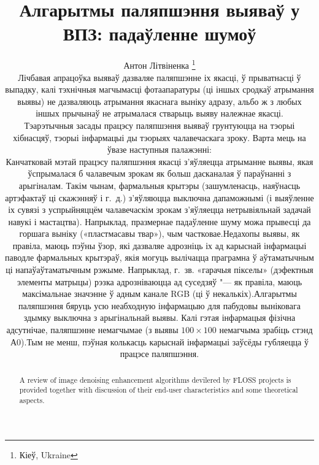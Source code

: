 \documentclass[10pt, a5paper]{article}
\begin{document}
\title{Алгарытмы паляпшэння выяваў у ВПЗ: падаўленне шумоў}
\author{Антон Літвіненка \footnote{Кіеў, Ukraine}
\maketitle
\begin{abstract}
A review of image denoising enhancement algorithms devilered by FLOSS projects is provided together with discussion of their end-user characteristics and some theoretical aspects.
\end{abstract}
Лічбавая апрацоўка выяваў дазваляе паляпшэнне іх якасці, ў прыватнасці ў выпадку, калі тэхнічныя магчымасці фотаапаратуры (ці іншых сродкаў атрымання выявы) не дазваляюць атрымання якаснага выніку адразу, альбо ж з любых іншых прычынаў не атрымалася стварыць выяву належнае якасці.

Тэарэтычныя засады працэсу паляпшэння выяваў грунтуюцца на тэорыі хібнасцяў, тэорыі інфармацыі ды тэорыях чалавечаскага зроку. Варта мець на ўвазе наступныя палажэнні:

\begin{enumerate}
  \item Канчатковай мэтай працэсу паляпшэння якасці з’яўляецца атрыманне выявы, якая ўспрымалася б чалавечым зрокам як больш дасканалая ў параўнанні з арыгіналам. Такім чынам, фармальныя крытэры (зашумленасць, наяўнасць артэфактаў ці скажэнняў і г.~д.) з’яўляюцца выключна дапаможнымі (і выяўленне іх сувязі з успрыйняццём чалавечаскім зрокам з’яўляецца нетрывіяльнай задачай навукі і мастацтва). Напрыклад, празмернае падаўленне шуму можа прывесці да горшага выніку  («пластмасавы твар»), чым частковае.
  \item Недахопы выявы, як правіла, маюць пэўны ўзор, які дазваляе адрозніць іх ад карыснай інфармацыі паводле фармальных крытэраў, якія могуць вылічацца праграмна ў аўтаматычным ці напаўаўтаматычным рэжыме. Напрыклад, г.~зв. «гарачыя пікселы» (дэфектныя элементы матрыцы) рэзка адрозніваюцца ад суседзяў "--- як правіла, маюць максімальнае значэнне ў адным канале RGB (ці ў некалькіх).
  \item Алгарытмы паляпшэння бяруць усю неабходную інфармацыю для пабудовы выніковага здымку выключна з арыгінальнай выявы. Калі гэтая інфармацыя фізічна адсутнічае, паляпшэнне немагчымае (з выявы $100\times100$ немагчыма зрабіць стэнд А0).
  \item Тым не менш, пэўная колькасць карыснай інфармацыі заўсёды губляецца ў працэсе паляпшэння.
\end{enumerate}

}
\end{document}
